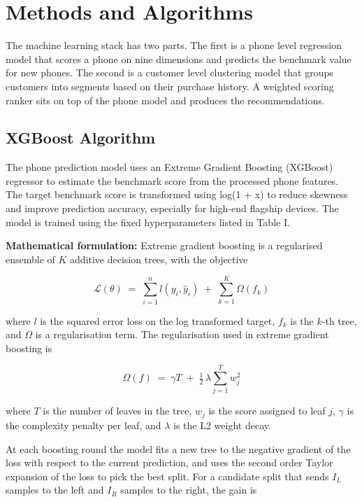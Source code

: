 \documentclass[12pt, a4paper]{report}
\numberwithin{figure}{chapter}
\numberwithin{table}{chapter}
\numberwithin{equation}{chapter}
\begin{document}
\section{Methods and Algorithms}

The machine learning stack has two parts. The first is a phone level regression model that scores a phone on nine dimensions and predicts the benchmark value for new phones. The second is a customer level clustering model that groups customers into segments based on their purchase history. A weighted scoring ranker sits on top of the phone model and produces the recommendations. 

\subsection{XGBoost Algorithm}

The phone prediction model uses an Extreme Gradient Boosting (XGBoost) regressor to estimate the benchmark score from the processed phone features. The target benchmark score is transformed using log(1 + x) to reduce skewness and improve prediction accuracy, especially for high-end flagship devices. The model is trained using the fixed hyperparameters listed in Table I.


\textbf{Mathematical formulation:} 
Extreme gradient boosting is a regularised ensemble of $K$ additive decision trees, with the objective

\begin{equation}
\mathcal{L}(\theta) \;=\; \sum_{i=1}^{n} l\!\left(y_i, \hat{y}_i\right) \;+\; \sum_{k=1}^{K} \Omega(f_k)
\label{eq:xgb-objective}
\end{equation}

\noindent where $l$ is the squared error loss on the log transformed target, $f_k$ is the $k$-th tree, and $\Omega$ is a regularisation term. The regularisation used in extreme gradient boosting is

\begin{equation}
\Omega(f) \;=\; \gamma T \;+\; \tfrac{1}{2}\, \lambda \sum_{j=1}^{T} w_j^{2}
\label{eq:xgb-regularisation}
\end{equation}

\noindent where $T$ is the number of leaves in the tree, $w_j$ is the score assigned to leaf $j$, $\gamma$ is the complexity penalty per leaf, and $\lambda$ is the L2 weight decay.

At each boosting round the model fits a new tree to the negative gradient of the loss with respect to the current prediction, and uses the second order Taylor expansion of the loss to pick the best split. For a candidate split that sends $I_L$ samples to the left and $I_R$ samples to the right, the gain is
\end{document}
